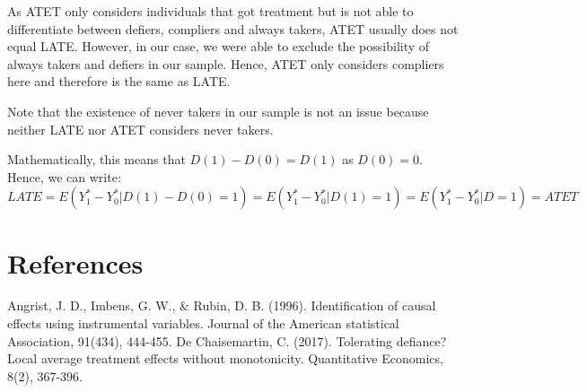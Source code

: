 \documentclass[
]{article}
\begin{document}
As ATET only considers individuals that got treatment but is not able to
differentiate between defiers, compliers and always takers, ATET usually
does not equal LATE. However, in our case, we were able to exclude the
possibility of always takers and defiers in our sample. Hence, ATET only
considers compliers here and therefore is the same as LATE.

Note that the existence of never takers in our sample is not an issue
because neither LATE nor ATET considers never takers.

Mathematically, this means that \(D(1)-D(0) = D(1)\) as \(D(0)=0\).
Hence, we can write: \[
LATE = E(Y_1^* - Y_0^*|D(1)-D(0)=1) = E(Y_1^* - Y_0^*|D(1)=1) = E(Y_1^* - Y_0^*|D=1) = ATET
\]

\hypertarget{references}{%
\section{References}\label{references}}

Angrist, J. D., Imbens, G. W., \& Rubin, D. B. (1996). Identification of
causal effects using instrumental variables. Journal of the American
statistical Association, 91(434), 444-455. De Chaisemartin, C. (2017).
Tolerating defiance? Local average treatment effects without
monotonicity. Quantitative Economics, 8(2), 367-396.
\end{document}
